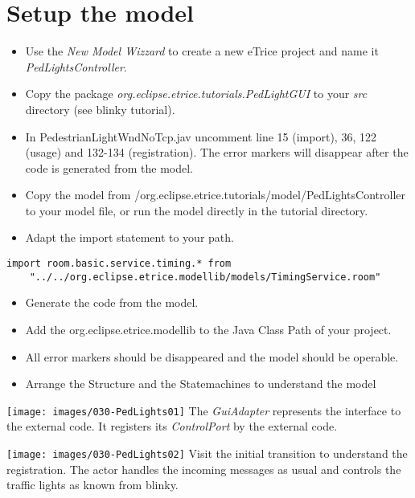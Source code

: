 \section{Setup the model}

\begin{itemize}
\item Use the \textit{New Model Wizzard} to create a new eTrice project and name it \textit{PedLightsController}.
\item Copy the package \textit{org.eclipse.etrice.tutorials.PedLightGUI} to your \textit{src} directory (see blinky tutorial).
\item In PedestrianLightWndNoTcp.jav uncomment line 15 (import), 36, 122 (usage) and 132-134 (registration). The error markers will disappear after the code is generated from the model.
\item \begin{flushleft}Copy the model from /org.eclipse.etrice.tutorials/model/PedLightsController to your model file, or run the model directly in the tutorial directory.\end{flushleft} 
\item Adapt the import statement to your path.
\end{itemize}

\begin{small}
\begin{verbatim} 
import room.basic.service.timing.* from 
	"../../org.eclipse.etrice.modellib/models/TimingService.room" 
\end{verbatim}
\end{small}

\begin{itemize}
\item Generate the code from the model.
\item Add the org.eclipse.etrice.modellib to the Java Class Path of your project.
\item All error markers should be disappeared and the model should be operable. 
\item Arrange the Structure and the Statemachines to understand the model
\end{itemize}

\texttt{[image: images/030-PedLights01]}
The \textit{GuiAdapter} represents the interface to the external code. It registers its \textit{ControlPort} by the external code.

\texttt{[image: images/030-PedLights02]}
Visit the initial transition to understand the registration. The actor handles the incoming messages as usual and controls the traffic lights as known from blinky. 

